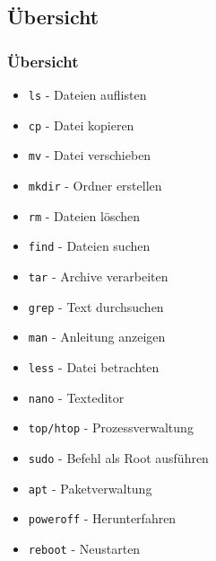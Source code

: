 \documentclass[12pt,utf8]{beamer}
\begin{document}
\subsection{Übersicht}
\begin{frame}
\frametitle{\LARGE Übersicht}
\small
\begin{minipage}{0.48\linewidth}
	\begin{itemize}
		\item \texttt{ls} - Dateien auflisten
		\item \texttt{cp} - Datei kopieren
		\item \texttt{mv} - Datei verschieben
		\item \texttt{mkdir} - Ordner erstellen
		\item \texttt{rm} - Dateien löschen
		\item \texttt{find} - Dateien suchen
		\item \texttt{tar} - Archive verarbeiten
		\item \texttt{grep} - Text durchsuchen
		\item \texttt{man} - Anleitung anzeigen
	\end{itemize}
\end{minipage}
\begin{minipage}{0.48\linewidth}
	\begin{itemize}
		\item \texttt{less} - Datei betrachten
		\item \texttt{nano} - Texteditor
		\item \texttt{top/htop} - Prozessverwaltung
		\item \texttt{sudo} - Befehl als Root ausführen
		\item \texttt{apt} - Paketverwaltung
		\item \texttt{poweroff} - Herunterfahren
		\item \texttt{reboot} - Neustarten
	\end{itemize}
\end{minipage}

\end{frame}
\end{document}

